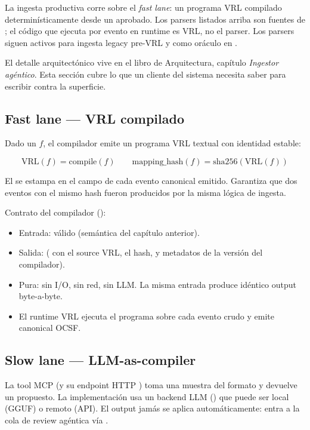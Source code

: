 La ingesta productiva corre sobre el \emph{fast lane}: un
programa VRL compilado determinísticamente desde un
 aprobado. Los parsers listados arriba son
fuentes de ; el código que ejecuta por evento en
runtime es VRL, no el parser. Los parsers siguen activos para
ingesta legacy pre-VRL y como oráculo en
.

El detalle arquitectónico vive en el libro de Arquitectura,
capítulo \emph{Ingestor agéntico}. Esta sección cubre lo que un
cliente del sistema necesita saber para escribir contra la
superficie.

\subsection{Fast lane — VRL compilado}

Dado un  $f$, el compilador emite un programa
VRL textual con identidad estable:

\begin{equation*}
\text{VRL}(f) = \text{compile}(f) \qquad
\text{mapping\_hash}(f) = \text{sha256}(\text{VRL}(f))
\end{equation*}

El  se estampa en el campo
 de cada evento canonical emitido.
Garantiza que dos eventos con el mismo hash fueron producidos por
la misma lógica de ingesta.

Contrato del compilador ():

\begin{itemize}
    \item Entrada:  válido (semántica del
    capítulo anterior).
    \item Salida:  ( con el source
    VRL, el hash, y metadatos de la versión del compilador).
    \item Pura: sin I/O, sin red, sin LLM. La misma entrada produce
    idéntico output byte-a-byte.
    \item El runtime VRL ejecuta el programa sobre cada evento
    crudo y emite canonical OCSF.
\end{itemize}

\subsection{Slow lane — LLM-as-compiler}

La tool MCP  (y su endpoint HTTP
) toma una muestra del formato y
devuelve un  propuesto. La implementación usa un
backend LLM () que puede ser local
(GGUF) o remoto (API). El output jamás se aplica automáticamente:
entra a la cola de review agéntica vía
.

